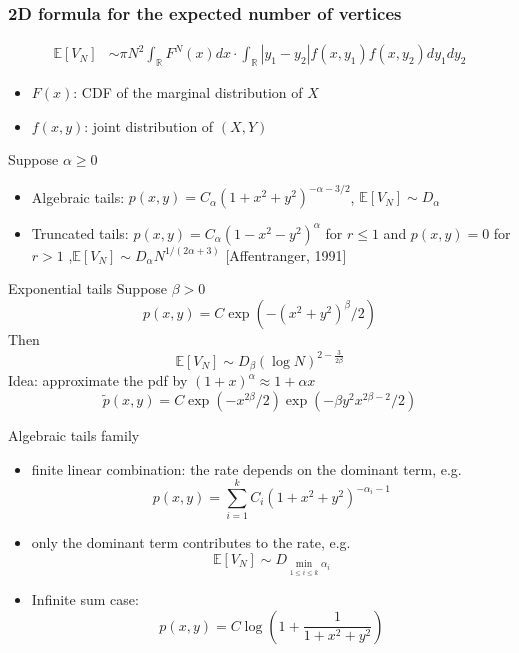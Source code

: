 \documentclass{beamer}
\def\E{\mathbb{E}}
\def\R{\mathbb{R}}
\begin{document}
\begin{frame}
    \frametitle{
        2D formula for the expected number of vertices
    }
    \begin{align*}
        \E[V_N]
        & \sim \pi N^2 \int_{\R} F^{N}(x) dx \cdot \int_{\R} |y_1-y_2| f(x, y_1) f(x,y_2)dy_1dy_2
    \end{align*}
    \begin{itemize}
        \item $F(x)$: CDF of the marginal distribution of $X$
        \item $f(x,y)$: joint distribution of $(X,Y)$
    \end{itemize}
    Suppose $\alpha \geq 0$
    \begin{itemize}
        \item Algebraic tails: $p(x,y) = C_{\alpha}(1+x^2+y^2)^{-\alpha-3/2}$,
        $\E[V_N] \sim D_{\alpha}$
        \item Truncated tails: $p(x,y) = C_{\alpha}(1-x^2-y^2)^{\alpha}$ for $r\leq 1$ and $p(x,y)=0$ for $r>1$
        ,$\E[V_N] \sim D_{\alpha} N^{1/(2\alpha + 3)}$ [Affentranger, 1991]
    \end{itemize}
\end{frame}
\begin{frame}{Exponential tails}
    Suppose $\beta > 0$
\begin{equation*}
    p(x,y) = C  \exp(-(x^2+y^2)^{\beta}/2)    
\end{equation*}
Then 
\begin{equation*}
    \E[V_N] \sim D_{\beta} (\log N)^{2-\frac{3}{2\beta}}
\end{equation*}
Idea: approximate the pdf by
$(1+x)^{\alpha} \approx 1+\alpha x$
\begin{equation*}
    \tilde{p}(x,y)=
    C \exp(-x^{2\beta}/2) \exp(-\beta y^2 x^{2\beta-2}/2)
\end{equation*}
\end{frame}
\begin{frame}{Algebraic tails family}
    \begin{itemize}
        \item finite linear combination: the rate depends on the dominant term, e.g.
        \begin{equation*}
            p(x,y) = \sum_{i=1}^k C_i (1+x^2+y^2)^{-\alpha_i - 1}
        \end{equation*}
        \item only the dominant term contributes to the rate, e.g.
        \begin{equation*}
            \E[V_N] \sim D_{\min_{1\leq i\leq k} \alpha_i}
        \end{equation*}
        \item Infinite sum case:
        \begin{equation*}
            p(x,y) = C \log \left(1+\frac{1}{1+x^2+y^2} \right)
        \end{equation*}
    \end{itemize}
\end{frame}
\end{document}
